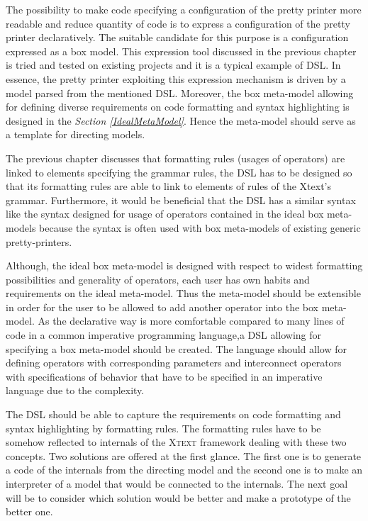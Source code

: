 \documentclass[12pt,notitlepage,a4paper]{report}
\begin{document}
The possibility to make code specifying a configuration of the pretty printer more readable and reduce quantity of code is to express a configuration of the pretty printer declaratively. The suitable candidate for this purpose is a configuration expressed as a box model. This expression tool discussed in the previous chapter is tried and tested on existing projects and it is a typical example of DSL. In essence, the pretty printer exploiting this expression mechanism is driven by a model parsed from the mentioned DSL. Moreover, the box meta-model allowing for defining diverse requirements on code formatting and syntax highlighting is designed in the \textit{Section \ref{IdealMetaModel}}. Hence the meta-model should serve as a template for directing models.

The previous chapter discusses that formatting rules (usages of operators) are linked to elements specifying the grammar rules, the DSL has to be designed so that its formatting rules are able to link to elements of rules of the Xtext's grammar.  Furthermore, it would be beneficial that the DSL has a similar syntax like the syntax designed for usage of operators contained in the ideal box meta-models because the syntax is often used with box meta-models of existing generic pretty-printers.

Although, the ideal box meta-model is designed with respect to widest formatting possibilities and generality of operators,  each user has own habits and requirements on the ideal meta-model. Thus the meta-model should be extensible in order for the user to be allowed to add another operator into the box meta-model. As the declarative way is more comfortable compared to many lines of code in a common imperative programming language,a DSL allowing for specifying a box meta-model  should be created. The language should allow for defining operators with corresponding parameters and interconnect operators with specifications of behavior that have to be specified in an imperative language due to the complexity. 

The DSL should be able to capture the requirements on code formatting and syntax highlighting by formatting rules. The formatting rules have to be somehow reflected to internals of the \textsc{Xtext} framework dealing with these two concepts. Two solutions are offered at the first glance. The first one is to generate a code of the internals from the directing model and the second one is to make an interpreter of a model that would be connected to the internals. The next goal will be to consider which solution would be better and make a prototype of the better one.
\end{document}
